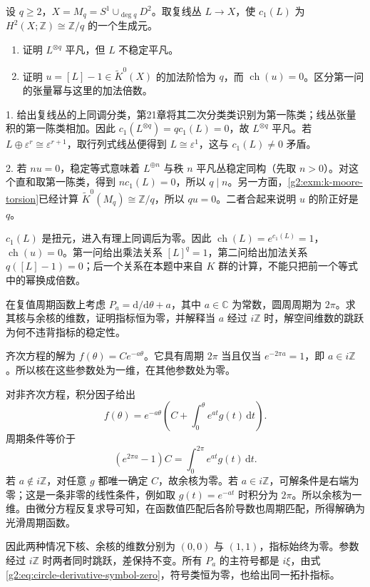 \begin{exercise}\label{g2:ex:chern-lens-torsion-line}
	设 \(q\ge2\)，\(X=M_q=S^1\cup_{\deg q}D^2\)。取复线丛 \(L\to X\)，使 \(c_1(L)\) 为 \(H^2(X;\mathbb Z)\cong\mathbb Z/q\) 的一个生成元。
	\begin{enumerate}
		\item 证明 \(L^{\otimes q}\) 平凡，但 \(L\) 不稳定平凡。
		\item 证明 \(u=[L]-1\in\widetilde K^0(X)\) 的加法阶恰为 \(q\)，而 \(\operatorname{ch}(u)=0\)。区分第一问的张量幂与这里的加法倍数。
	\end{enumerate}
\end{exercise}
\begin{solution}
	1. 给出复线丛的上同调分类，第21章将其二次分类类识别为第一陈类；线丛张量积的第一陈类相加。因此 \(c_1(L^{\otimes q})=q c_1(L)=0\)，故 \(L^{\otimes q}\) 平凡。若 \(L\oplus\varepsilon^r\cong\varepsilon^{r+1}\)，取行列式线丛便得到 \(L\cong\varepsilon^1\)，这与 \(c_1(L)\ne0\) 矛盾。

	2. 若 \(nu=0\)，稳定等式意味着 \(L^{\oplus n}\) 与秩 \(n\) 平凡丛稳定同构（先取 \(n>0\)）。对这个直和取第一陈类，得到 \(n c_1(L)=0\)，所以 \(q\mid n\)。另一方面，\cref{g2:exm:k-moore-torsion}已经计算 \(\widetilde K^0(M_q)\cong\mathbb Z/q\)，所以 \(qu=0\)。二者合起来说明 \(u\) 的阶正好是 \(q\)。

	\(c_1(L)\) 是扭元，进入有理上同调后为零。因此 \(\operatorname{ch}(L)=e^{c_1(L)}=1\)，\(\operatorname{ch}(u)=0\)。第一问给出乘法关系 \([L]^q=1\)，第二问给出加法关系 \(q([L]-1)=0\)；后一个关系在本题中来自 \(K\) 群的计算，不能只把前一个等式中的幂换成倍数。
\end{solution}

\begin{exercise}\label{g2:ex:circle-derivative-zeroth-order}
	在复值周期函数上考虑 \(P_a=\mathrm d/\mathrm d\theta+a\)，其中 \(a\in\mathbb C\) 为常数，圆周周期为 \(2\pi\)。求其核与余核的维数，证明指标恒为零，并解释当 \(a\) 经过 \(i\mathbb Z\) 时，解空间维数的跳跃为何不违背指标的稳定性。
\end{exercise}
\begin{solution}
	齐次方程的解为 \(f(\theta)=Ce^{-a\theta}\)。它具有周期 \(2\pi\) 当且仅当 \(e^{-2\pi a}=1\)，即 \(a\in i\mathbb Z\)。所以核在这些参数处为一维，在其他参数处为零。

	对非齐次方程，积分因子给出
	\[
		f(\theta)=e^{-a\theta}\left(C+\int_0^\theta e^{at}g(t)\,\mathrm dt\right).
	\]
	周期条件等价于
	\[
		(e^{2\pi a}-1)C=\int_0^{2\pi}e^{at}g(t)\,\mathrm dt.
	\]
	若 \(a\notin i\mathbb Z\)，对任意 \(g\) 都唯一确定 \(C\)，故余核为零。若 \(a\in i\mathbb Z\)，可解条件是右端为零；这是一条非零的线性条件，例如取 \(g(t)=e^{-at}\) 时积分为 \(2\pi\)。所以余核为一维。由微分方程反复求导可知，在函数值匹配后各阶导数也周期匹配，所得解确为光滑周期函数。

	因此两种情况下核、余核的维数分别为 \((0,0)\) 与 \((1,1)\)，指标始终为零。参数经过 \(i\mathbb Z\) 时两者同时跳跃，差保持不变。所有 \(P_a\) 的主符号都是 \(i\xi\)，由式\eqref{g2:eq:circle-derivative-symbol-zero}，符号类恒为零，也给出同一拓扑指标。
\end{solution}

